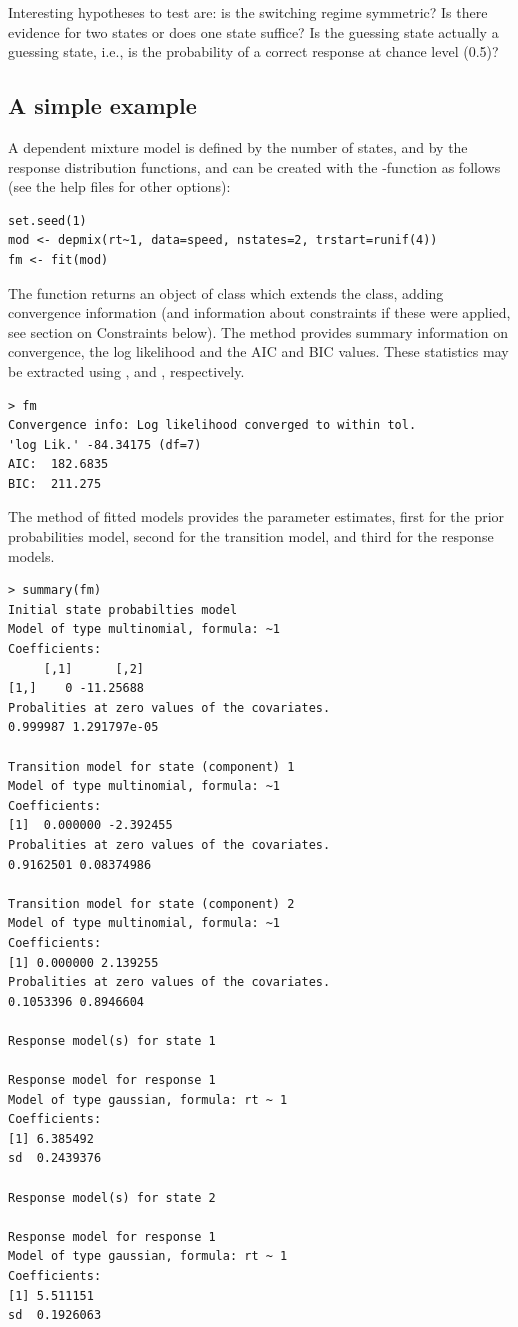 \documentclass[article]{jss}
\begin{document}
Interesting hypotheses to test are: is the switching regime symmetric?
Is there evidence for two states or does one state suffice?  Is the
guessing state actually a guessing state, i.e., is the probability
of a correct response at chance level (0.5)?


\subsection{A simple example}

A dependent mixture model is defined by the number of states, and by
the response distribution functions, and can be created with the
-function as follows (see the help files for other
options):

\begin{verbatim} 
set.seed(1)
mod <- depmix(rt~1, data=speed, nstates=2, trstart=runif(4))
fm <- fit(mod)
\end{verbatim}

The function returns an object of class  which
extends the  class, adding convergence information (and
information about constraints if these were applied, see section on Constraints below).  The
 method provides summary information on convergence, the log likelihood
and the AIC and BIC values. These statistics may be extracted using  ,
 and , respectively. 

\begin{verbatim}
> fm 
Convergence info: Log likelihood converged to within tol. 
'log Lik.' -84.34175 (df=7)
AIC:  182.6835 
BIC:  211.275 
\end{verbatim}

The  method of fitted models provides the parameter estimates, first for
the prior probabilities model, second for the transition model, and third for the response models. 

\begin{verbatim}
> summary(fm)
Initial state probabilties model 
Model of type multinomial, formula: ~1
Coefficients: 
     [,1]      [,2]
[1,]    0 -11.25688
Probalities at zero values of the covariates.
0.999987 1.291797e-05 

Transition model for state (component) 1 
Model of type multinomial, formula: ~1
Coefficients: 
[1]  0.000000 -2.392455
Probalities at zero values of the covariates.
0.9162501 0.08374986 

Transition model for state (component) 2 
Model of type multinomial, formula: ~1
Coefficients: 
[1] 0.000000 2.139255
Probalities at zero values of the covariates.
0.1053396 0.8946604 

Response model(s) for state 1 

Response model for response 1 
Model of type gaussian, formula: rt ~ 1
Coefficients: 
[1] 6.385492
sd  0.2439376 

Response model(s) for state 2 

Response model for response 1 
Model of type gaussian, formula: rt ~ 1
Coefficients: 
[1] 5.511151
sd  0.1926063 
\end{verbatim}
\end{document}
